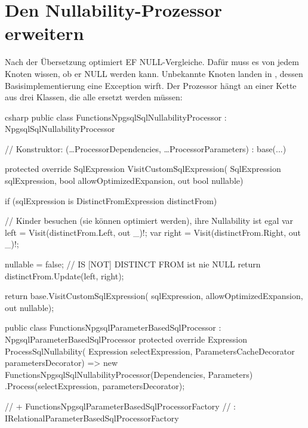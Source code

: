 \section{Den Nullability-Prozessor erweitern}

Nach der Übersetzung optimiert EF NULL-Vergleiche. Dafür muss es von jedem Knoten wissen, ob
er NULL werden kann. Unbekannte Knoten landen in
, dessen
Basisimplementierung eine Exception wirft. Der Prozessor hängt an einer Kette aus drei
Klassen, die alle ersetzt werden müssen:

\begin{sourcecode}{csharp}
public class FunctionsNpgsqlSqlNullabilityProcessor : NpgsqlSqlNullabilityProcessor
{
    // Konstruktor: (…ProcessorDependencies, …ProcessorParameters) : base(...)

    protected override SqlExpression VisitCustomSqlExpression(
        SqlExpression sqlExpression, bool allowOptimizedExpansion, out bool nullable)
    {
        if (sqlExpression is DistinctFromExpression distinctFrom)
        {
            // Kinder besuchen (sie können optimiert werden), ihre Nullability ist egal
            var left = Visit(distinctFrom.Left, out _)!;
            var right = Visit(distinctFrom.Right, out _)!;

            nullable = false;                   // IS [NOT] DISTINCT FROM ist nie NULL
            return distinctFrom.Update(left, right);
        }

        return base.VisitCustomSqlExpression(
            sqlExpression, allowOptimizedExpansion, out nullable);
    }
}

public class FunctionsNpgsqlParameterBasedSqlProcessor : NpgsqlParameterBasedSqlProcessor
{
    protected override Expression ProcessSqlNullability(
        Expression selectExpression, ParametersCacheDecorator parametersDecorator)
        => new FunctionsNpgsqlSqlNullabilityProcessor(Dependencies, Parameters)
            .Process(selectExpression, parametersDecorator);
}

// + FunctionsNpgsqlParameterBasedSqlProcessorFactory
//   : IRelationalParameterBasedSqlProcessorFactory
\end{sourcecode}

